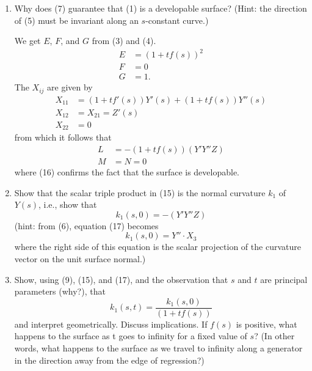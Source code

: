 \documentclass{book}
\begin{document}
\begin{enumerate}
  \item Why does (7) guarantee that (1) is a developable surface? (Hint: the direction of (5) must be invariant along an $s$-constant curve.)

     We get $E$, $F$, and $G$ from (3) and (4).
    \begin{align}
      E & = (1 + tf(s))^{2} \\
      F & = 0 \\
      G & = 1.
    \end{align}
    The $X_{ij}$ are given by
    \begin{align}
      X_{11} & = (1 + tf'(s)) Y'(s) + (1 + tf(s)) Y''(s) \\
      X_{12} & = X_{21} = Z'(s) \\
      X_{22} & = 0
    \end{align}
    from which it follows that
    \begin{align}
      L & = - (1 + tf(s)) (Y' Y'' Z) \\
      M & = N = 0
    \end{align}
    where (16) confirms the fact that the surface is developable.
  \item Show that the scalar triple product in (15) is the normal curvature $k_{1}$ of $Y(s)$, i.e., show that
    \begin{equation}
      k_{1} (s,0) = - (Y' Y'' Z)
    \end{equation}
    (hint: from (6), equation (17) becomes
    \begin{equation}
      k_{1} (s,0) = Y'' \cdot X_{3}
    \end{equation}
    where the right side of this equation is the scalar projection of the curvature vector on the unit surface normal.)
  \item Show, using (9), (15), and (17), and the observation that $s$ and $t$ are principal parameters (why?), that
    \begin{equation}
      k_{1}(s,t) = \frac{k_{1}(s,0)}{(1 + tf(s))}
    \end{equation}
    and interpret geometrically. Discuss implications. If $f(s)$ is positive, what happens to the surface as t goes to infinity for a fixed value of $s$? (In other words, what happens to the surface as we travel to infinity along a generator in the direction away from the edge of regression?)


\end{enumerate}
\end{document}
